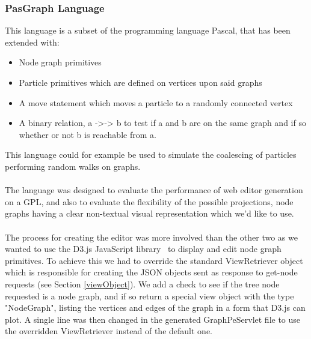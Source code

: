 \documentclass{article}
\begin{document}
{\subsubsection{PasGraph Language}\label{pasgraph}
This language is a subset of the programming language Pascal, that has been extended with: 
\begin{itemize}
\item Node graph primitives
\item Particle primitives which are defined on vertices upon said graphs
\item A move statement which moves a particle to a randomly connected vertex
\item A binary relation, a ->-> b to test if a and b are on the same graph and if so whether or not b is reachable from a.
\end{itemize}
This language could for example be used to simulate the coalescing of particles performing random walks on graphs. 
\\
\\
The language was designed to evaluate the performance of web editor generation on a GPL, and also to evaluate the flexibility of the possible projections, node graphs having a clear non-textual visual representation which we'd like to use.
\\
\\
The process for creating the editor was more involved than the other two as we wanted to use the D3.js JavaScript library~\cite{d3} to display and edit node graph primitives. To achieve this we had to override the standard ViewRetriever object which is responsible for creating the JSON objects sent as response to get-node requests (see Section \ref{viewObject}). We add a check to see if the tree node requested is a node graph, and if so return a special view object with the type "NodeGraph", listing the vertices and edges of the graph in a form that D3.js can plot. A single line was then changed in the generated GraphPeServlet file to use the overridden ViewRetriever instead of the default one.
\begin{figure}[h!]
  \centering

\end{figure}}
\end{document}
